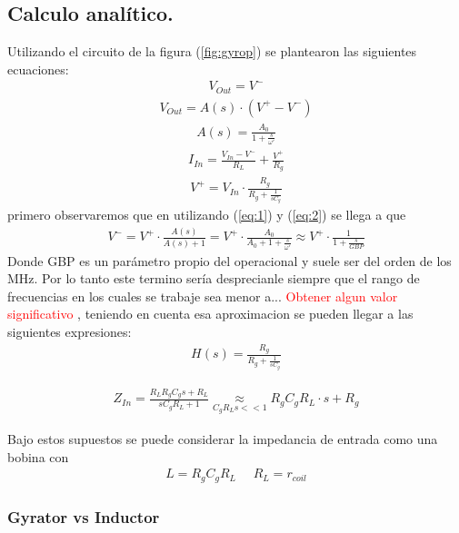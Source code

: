 \documentclass[a4paper]{article}
\begin{document}
\subsection{Calculo analítico.}
Utilizando el circuito de la figura (\ref{fig:gyrop}) se plantearon las siguientes ecuaciones:
\begin{align}   V_{Out} = V^- \label{eq:1}\end{align}
\begin{align} V_{Out} = A(s) \cdot (V^+-V^-)\label{eq:2}\end{align}
\begin{align} A(s)= \frac{A_0}{1+\frac{s}{\omega'}}\end{align}
\begin{align} I_{In}=\frac{V_{In}-V^-}{R_L}+\frac{V^+}{R_g}\end{align}
\begin{align} V^+=V_{In}\cdot \frac{R_g}{R_g+\frac{1}{sC_g}} \end{align}
primero observaremos que en utilizando (\ref{eq:1}) y (\ref{eq:2}) se llega a que 
\begin{align}V^- =V^+ \cdot \frac{A(s)}{A(s)+1} = V^+ \cdot \frac{A_0}{A_0+1+\frac{s}{\omega'}} \approx V^+ \cdot \frac{1}{1+\frac{s}{GBP}} \label{eq:desp}   \end{align}
Donde GBP es un parámetro propio del operacional y suele ser del orden de los MHz. Por lo tanto este termino sería desprecianle siempre que el rango de frecuencias en los cuales se trabaje sea menor a... \center \textcolor{red}{Obtener algun valor significativo}
, teniendo en cuenta esa aproximacion se pueden llegar a las siguientes expresiones:
\begin{align}H(s)= \frac{R_g}{R_g+\frac{1}{sC_g}} \end{align}


\begin{align}Z_{In}=\frac{R_LR_gC_gs+R_L}{sC_gR_L+1}\underset{C_gR_Ls << 1}{\approx}R_gC_gR_L \cdot s + R_g \end{align}

Bajo estos supuestos se puede considerar la impedancia de entrada como una bobina con 
\begin{align}  L=R_gC_gR_L  \ \ \ \ \ \  R_L=r_{coil} \label{eq:basicL1}\end{align}
\subsubsection{Gyrator vs Inductor}
\end{document}
